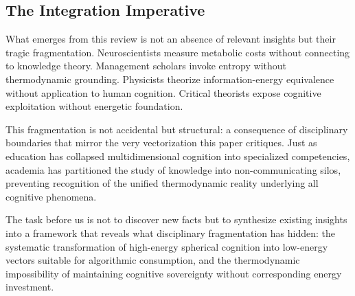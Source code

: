 \subsection{The Integration Imperative}

What emerges from this review is not an absence of relevant insights but their tragic fragmentation. Neuroscientists measure metabolic costs without connecting to knowledge theory. Management scholars invoke entropy without thermodynamic grounding. Physicists theorize information-energy equivalence without application to human cognition. Critical theorists expose cognitive exploitation without energetic foundation.

This fragmentation is not accidental but structural: a consequence of disciplinary boundaries that mirror the very vectorization this paper critiques. Just as education has collapsed multidimensional cognition into specialized competencies, academia has partitioned the study of knowledge into non-communicating silos, preventing recognition of the unified thermodynamic reality underlying all cognitive phenomena.

The task before us is not to discover new facts but to synthesize existing insights into a framework that reveals what disciplinary fragmentation has hidden: the systematic transformation of high-energy spherical cognition into low-energy vectors suitable for algorithmic consumption, and the thermodynamic impossibility of maintaining cognitive sovereignty without corresponding energy investment.